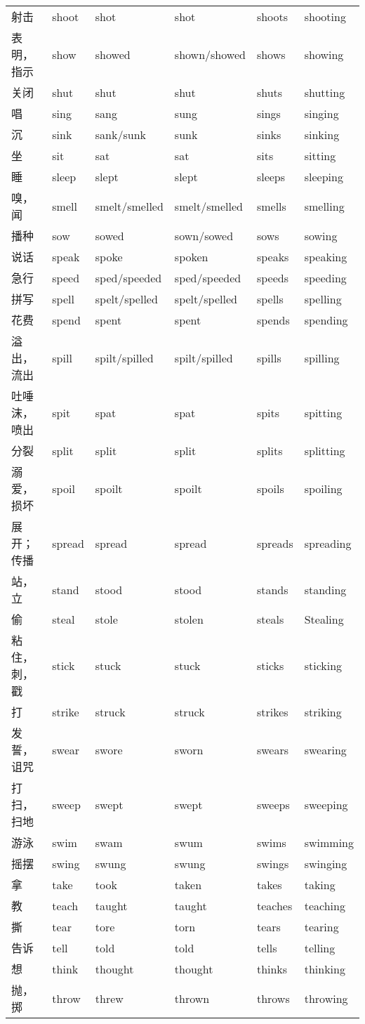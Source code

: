 \begin{longtable}{llllll}
射击&shoot&shot&shot&shoots&shooting\\
表明，指示&show&showed&shown/showed&shows&showing\\
关闭&shut&shut&shut&shuts&shutting\\
唱&sing&sang&sung&sings&singing\\
沉&sink&sank/sunk&sunk&sinks&sinking\\
坐&sit&sat&sat&sits&sitting\\
睡&sleep&slept&slept&sleeps&sleeping\\
嗅，闻&smell&smelt/smelled&smelt/smelled&smells&smelling\\
播种&sow&sowed&sown/sowed&sows&sowing\\
说话&speak&spoke&spoken&speaks&speaking\\
急行&speed&sped/speeded&sped/speeded&speeds&speeding\\
拼写&spell&spelt/spelled&spelt/spelled&spells&spelling\\
花费&spend&spent&spent&spends&spending\\
溢出，流出&spill&spilt/spilled&spilt/spilled&spills&spilling\\
吐唾沫，喷出&spit&spat&spat&spits&spitting\\
分裂&split&split&split&splits&splitting\\
溺爱，损坏&spoil&spoilt&spoilt&spoils&spoiling\\
展开；传播&spread&spread&spread&spreads&spreading\\
站，立&stand&stood&stood&stands&standing\\
偷&steal&stole&stolen&steals&Stealing\\
粘住，刺，戳&stick&stuck&stuck&sticks&sticking\\
打&strike&struck&struck&strikes&striking\\
发誓，诅咒&swear&swore&sworn&swears&swearing\\
打扫，扫地&sweep&swept&swept&sweeps&sweeping\\
游泳&swim&swam&swum&swims&swimming\\
摇摆&swing&swung&swung&swings&swinging\\
拿&take&took&taken&takes&taking\\
教&teach&taught&taught&teaches&teaching\\
撕&tear&tore&torn&tears&tearing\\
告诉&tell&told&told&tells&telling\\
想&think&thought&thought&thinks&thinking\\
抛，掷&throw&threw&thrown&throws&throwing\\

\end{longtable}
